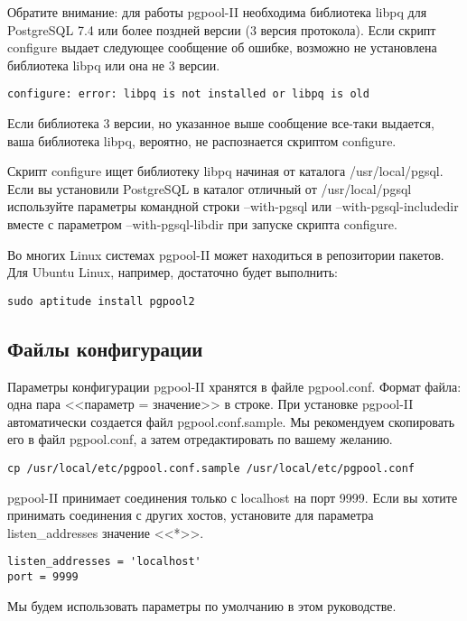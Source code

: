 Обратите внимание: для работы pgpool-II необходима библиотека libpq для PostgreSQL 7.4 или более поздней версии (3 версия протокола).
Если скрипт configure выдает следующее сообщение об ошибке, возможно не установлена библиотека libpq или она не 3 версии.
\begin{lstlisting}[label=lst:pgpool2,caption=Установка pgpool-II]
configure: error: libpq is not installed or libpq is old
\end{lstlisting}

Если библиотека 3 версии, но указанное выше сообщение все-таки выдается, ваша библиотека libpq, вероятно, 
не распознается скриптом configure.

Скрипт configure ищет библиотеку libpq начиная от каталога /usr/local/pgsql. Если вы установили PostgreSQL в каталог 
отличный от /usr/local/pgsql используйте параметры командной строки --with-pgsql или --with-pgsql-includedir вместе с 
параметром --with-pgsql-libdir при запуске скрипта configure.

Во многих Linux системах pgpool-II может находиться в репозитории пакетов. 
Для Ubuntu Linux, например, достаточно будет выполнить:
\begin{lstlisting}[label=lst:pgpool3,caption=Установка pgpool-II]
sudo aptitude install pgpool2
\end{lstlisting}

\subsection{Файлы конфигурации}
Параметры конфигурации pgpool-II хранятся в файле pgpool.conf. Формат файла: одна пара <<параметр = значение>> в строке. 
При установке pgpool-II автоматически создается файл pgpool.conf.sample. Мы рекомендуем скопировать его в файл pgpool.conf, 
а затем отредактировать по вашему желанию.
\begin{lstlisting}[label=lst:pgpool4,caption=Файлы конфигурации]
cp /usr/local/etc/pgpool.conf.sample /usr/local/etc/pgpool.conf
\end{lstlisting}

pgpool-II принимает соединения только с localhost на порт 9999. Если вы хотите принимать соединения с других хостов, 
установите для параметра listen\_addresses значение <<*>>.
\begin{lstlisting}[label=lst:pgpool5,caption=Файлы конфигурации]
listen_addresses = 'localhost'
port = 9999
\end{lstlisting}

Мы будем использовать параметры по умолчанию в этом руководстве.

